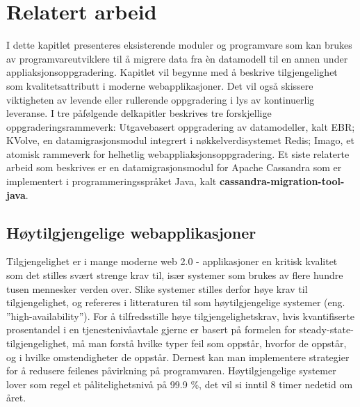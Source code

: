 
\chapter{Relatert arbeid}

I dette kapitlet presenteres eksisterende moduler og programvare som kan brukes av programvareutviklere til å migrere data fra èn datamodell til en annen under appliaksjonsoppgradering. Kapitlet vil begynne med å beskrive tilgjengelighet som kvalitetsattributt i moderne webapplikasjoner. Det vil også skissere viktigheten av  levende eller rullerende oppgradering i lys av kontinuerlig leveranse. I tre påfølgende delkapitler beskrives tre forskjellige oppgraderingsrammeverk: Utgavebasert oppgradering av datamodeller, kalt EBR; KVolve, en datamigrasjonsmodul integrert i nøkkelverdisystemet Redis; Imago, et atomisk rammeverk for helhetlig webappliaksjonsoppgradering. Et siste relaterte arbeid som beskrives er en datamigrasjonsmodul for Apache Cassandra som er implementert i programmeringsspråket Java, kalt \textbf{cassandra-migration-tool-java}.

\section{Høytilgjengelige webapplikasjoner}

Tilgjengelighet er i mange moderne web 2.0 - applikasjoner en kritisk kvalitet som det stilles svært strenge krav til, især systemer som brukes av flere hundre tusen mennesker verden over. Slike systemer stilles derfor høye krav til tilgjengelighet, og refereres i litteraturen til som høytilgjengelige systemer (eng. ''high-availability''). For å tilfredsstille høye tilgjengelighetskrav, hvis kvantifiserte prosentandel i en tjenestenivåavtale gjerne er basert på formelen for steady-state-tilgjengelighet, må man forstå hvilke typer feil som oppstår, hvorfor de oppstår, og i hvilke omstendigheter de oppstår. Dernest kan man implementere strategier for å redusere feilenes påvirkning på programvaren. Høytilgjengelige systemer lover som regel et pålitelighetsnivå på 99.9 \%, det vil si inntil 8 timer nedetid om året.








\cleardoublepage